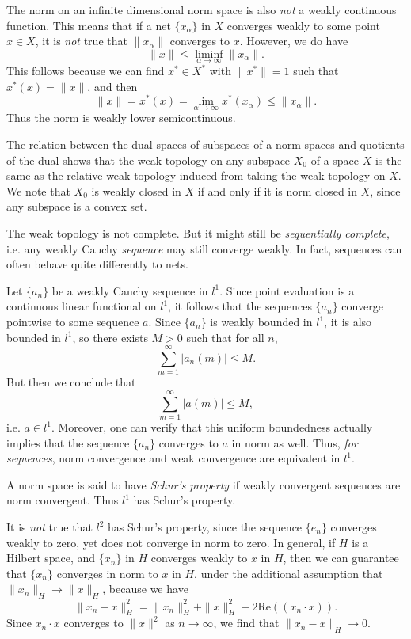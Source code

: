 The norm on an infinite dimensional norm space is also \emph{not} a weakly continuous function. This means that if a net $\{ x_\alpha \}$ in $X$ converges weakly to some point $x \in X$, it is \emph{not} true that $\| x_\alpha \|$ converges to $x$. However, we do have
%
\[ \| x \| \leq \liminf_{\alpha \to \infty} \| x_\alpha \|. \]
%
This follows because we can find $x^* \in X^*$ with $\| x^* \| = 1$ such that $x^*(x) = \| x \|$, and then
%
\[ \| x \| = x^*(x) = \lim_{\alpha \to \infty} x^*(x_\alpha) \leq \| x_\alpha \|. \]
%
Thus the norm is weakly lower semicontinuous.

The relation between the dual spaces of subspaces of a norm spaces and quotients of the dual shows that the weak topology on any subspace $X_0$ of a space $X$ is the same as the relative weak topology induced from taking the weak topology on $X$. We note that $X_0$ is weakly closed in $X$ if and only if it is norm closed in $X$, since any subspace is a convex set.

The weak topology is not complete. But it might still be \emph{sequentially complete}, i.e. any weakly Cauchy \emph{sequence} may still converge weakly. In fact, sequences can often behave quite differently to nets.

\begin{example}
    Let $\{ a_n \}$ be a weakly Cauchy sequence in $l^1$. Since point evaluation is a continuous linear functional on $l^1$, it follows that the sequences $\{ a_n \}$ converge pointwise to some sequence $a$. Since $\{ a_n \}$ is weakly bounded in $l^1$, it is also bounded in $l^1$, so there exists $M > 0$ such that for all $n$,
    \[ \sum_{m = 1}^\infty |a_n(m)| \leq M. \]
    But then we conclude that
    \[ \sum_{m = 1}^\infty |a(m)| \leq M, \]
    i.e. $a \in l^1$. Moreover, one can verify that this uniform boundedness actually implies that the sequence $\{ a_n \}$ converges to $a$ in norm as well. Thus, \emph{for sequences}, norm convergence and weak convergence are equivalent in $l^1$.
\end{example}

A norm space is said to have \emph{Schur's property} if weakly convergent sequences are norm convergent. Thus $l^1$ has Schur's property.

\begin{example}
    It is \emph{not} true that $l^2$ has Schur's property, since the sequence $\{ e_n \}$ converges weakly to zero, yet does not converge in norm to zero. In general, if $H$ is a Hilbert space, and $\{ x_n \}$ in $H$ converges weakly to $x$ in $H$, then we can guarantee that $\{ x_n \}$ converges in norm to $x$ in $H$, under the additional assumption that $\| x_n \|_H \to \| x \|_H$, because we have
    \[ \| x_n - x \|_H^2 = \| x_n \|^2_H + \| x \|^2_H - 2 \text{Re}( (x_n \cdot x) ). \]
    Since $x_n \cdot x$ converges to $\| x \|^2$ as $n \to \infty$, we find that $\| x_n - x \|_H \to 0$.
\end{example}

